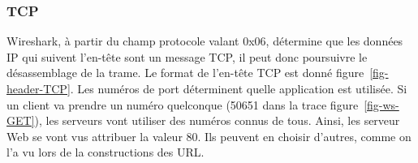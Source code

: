 \subsubsection{TCP}

Wireshark, à partir du champ protocole valant 0x06, détermine que les données IP qui suivent l'en-tête sont un message TCP, il peut donc poursuivre le désassemblage de la trame. Le format de l'en-tête TCP est donné figure~\vref{fig-header-TCP}. Les numéros de port déterminent quelle application est utilisée. Si un client va prendre un numéro quelconque (50651 dans la trace figure~\vref{fig-ws-GET}), les serveurs vont utiliser des numéros connus de tous. Ainsi, les serveur Web se vont vus attribuer la valeur 80. Ils peuvent en choisir d'autres, comme on l'a vu lors de la constructions des \ac{URL}. 


